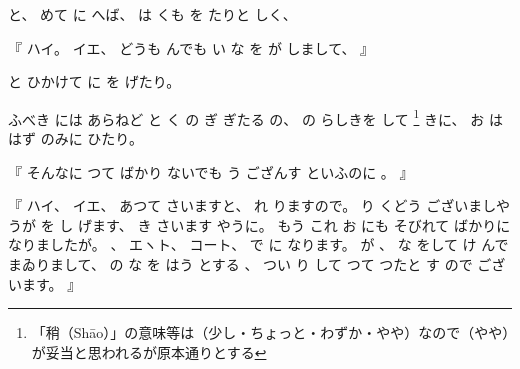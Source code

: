 %
と、
%
めて
に
へば、
%
は
くも
を
たりと
しく、

%
『
ハイ。
%
イエ、
%
どうも
んでも
い
な
を
が
しまして、
』

%
と
ひかけて
に
を
げたり。

%
ふべき
には
あらねど
と
く
の
ぎ
ぎたる
の、
%
の
らしきを
して
\footnote{「稍（Shāo）」の意味等は（少し・ちょっと・わずか・やや）なので（やや）が妥当と思われるが原本通りとする}%
きに、
%
お
は
はず
のみに
ひたり。

%
『
そんなに
つて
ばかり
ないでも
う
ござんす
といふのに
。
』

%
『
ハイ、
%
イエ、
%
あつて
さいますと、
%
れ%
りますので。
%
り
くどう
ございましやうが
を
し
げます、
%
き
さいます
やうに。
%
%
もう
これ
お
にも
そびれて
ばかりに
なりましたが。
%
、
エヽト、
%
コート、
%
で
に
なります。
%
が
、
%
な
をして
け
んで
まゐりまして、
%
の
な
を
はう
とする
、
%
つい
り
して
つて
つたと
す
ので
ございます。
』

